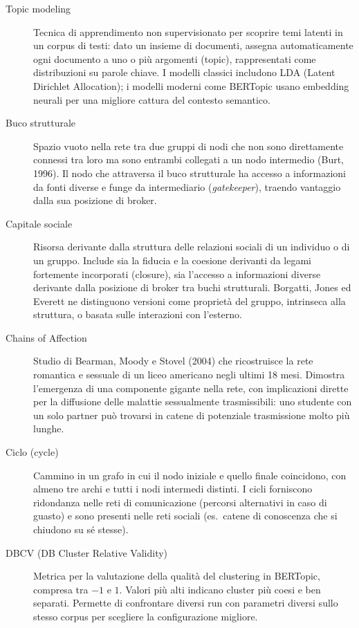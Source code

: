 \documentclass[12pt,a4paper]{article}
\begin{document}
\begin{description}
  \item[Topic modeling] Tecnica di apprendimento non supervisionato per scoprire temi
  latenti in un corpus di testi: dato un insieme di documenti, assegna automaticamente
  ogni documento a uno o più argomenti (topic), rappresentati come distribuzioni su
  parole chiave. I modelli classici includono LDA (Latent Dirichlet Allocation); i
  modelli moderni come BERTopic usano embedding neurali per una migliore cattura del
  contesto semantico.

  \item[Buco strutturale] Spazio vuoto nella rete tra due gruppi di nodi che non sono
  direttamente connessi tra loro ma sono entrambi collegati a un nodo intermedio (Burt,
  1996). Il nodo che attraversa il buco strutturale ha accesso a informazioni da fonti
  diverse e funge da intermediario (\textit{gatekeeper}), traendo vantaggio dalla
  sua posizione di broker.

  \item[Capitale sociale] Risorsa derivante dalla struttura delle relazioni sociali di
  un individuo o di un gruppo. Include sia la fiducia e la coesione derivanti da legami
  fortemente incorporati (closure), sia l'accesso a informazioni diverse derivante dalla
  posizione di broker tra buchi strutturali. Borgatti, Jones ed Everett ne distinguono
  versioni come proprietà del gruppo, intrinseca alla struttura, o basata sulle interazioni
  con l'esterno.

  \item[Chains of Affection] Studio di Bearman, Moody e Stovel (2004) che ricostruisce
  la rete romantica e sessuale di un liceo americano negli ultimi 18 mesi. Dimostra
  l'emergenza di una componente gigante nella rete, con implicazioni dirette per la
  diffusione delle malattie sessualmente trasmissibili: uno studente con un solo partner
  può trovarsi in catene di potenziale trasmissione molto più lunghe.

  \item[Ciclo (cycle)] Cammino in un grafo in cui il nodo iniziale e quello finale
  coincidono, con almeno tre archi e tutti i nodi intermedi distinti. I cicli forniscono
  ridondanza nelle reti di comunicazione (percorsi alternativi in caso di guasto) e sono
  presenti nelle reti sociali (es.\ catene di conoscenza che si chiudono su sé stesse).

  \item[DBCV (DB Cluster Relative Validity)] Metrica per la valutazione della qualità
  del clustering in BERTopic, compresa tra $-1$ e $1$. Valori più alti indicano cluster
  più coesi e ben separati. Permette di confrontare diversi run con parametri diversi
  sullo stesso corpus per scegliere la configurazione migliore.


\end{description}
\end{document}
